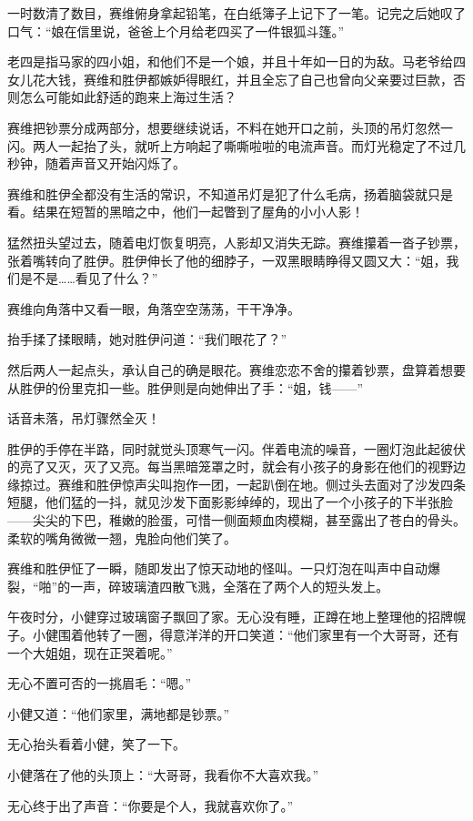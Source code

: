 一时数清了数目，赛维俯身拿起铅笔，在白纸簿子上记下了一笔。记完之后她叹了口气：``娘在信里说，爸爸上个月给老四买了一件银狐斗篷。''

老四是指马家的四小姐，和他们不是一个娘，并且十年如一日的为敌。马老爷给四女儿花大钱，赛维和胜伊都嫉妒得眼红，并且全忘了自己也曾向父亲要过巨款，否则怎么可能如此舒适的跑来上海过生活？

赛维把钞票分成两部分，想要继续说话，不料在她开口之前，头顶的吊灯忽然一闪。两人一起抬了头，就听上方响起了嘶嘶啦啦的电流声音。而灯光稳定了不过几秒钟，随着声音又开始闪烁了。

赛维和胜伊全都没有生活的常识，不知道吊灯是犯了什么毛病，扬着脑袋就只是看。结果在短暂的黑暗之中，他们一起瞥到了屋角的小小人影！

猛然扭头望过去，随着电灯恢复明亮，人影却又消失无踪。赛维攥着一沓子钞票，张着嘴转向了胜伊。胜伊伸长了他的细脖子，一双黑眼睛睁得又圆又大：``姐，我们是不是\ldots{}\ldots{}看见了什么？''

赛维向角落中又看一眼，角落空空荡荡，干干净净。

抬手揉了揉眼睛，她对胜伊问道：``我们眼花了？''

然后两人一起点头，承认自己的确是眼花。赛维恋恋不舍的攥着钞票，盘算着想要从胜伊的份里克扣一些。胜伊则是向她伸出了手：``姐，钱——''

话音未落，吊灯骤然全灭！

胜伊的手停在半路，同时就觉头顶寒气一闪。伴着电流的噪音，一圈灯泡此起彼伏的亮了又灭，灭了又亮。每当黑暗笼罩之时，就会有小孩子的身影在他们的视野边缘掠过。赛维和胜伊惊声尖叫抱作一团，一起趴倒在地。侧过头去面对了沙发四条短腿，他们猛的一抖，就见沙发下面影影绰绰的，现出了一个小孩子的下半张脸——尖尖的下巴，稚嫩的脸蛋，可惜一侧面颊血肉模糊，甚至露出了苍白的骨头。柔软的嘴角微微一翘，鬼脸向他们笑了。

赛维和胜伊怔了一瞬，随即发出了惊天动地的怪叫。一只灯泡在叫声中自动爆裂，``啪''的一声，碎玻璃渣四散飞溅，全落在了两个人的短头发上。

午夜时分，小健穿过玻璃窗子飘回了家。无心没有睡，正蹲在地上整理他的招牌幌子。小健围着他转了一圈，得意洋洋的开口笑道：``他们家里有一个大哥哥，还有一个大姐姐，现在正哭着呢。''

无心不置可否的一挑眉毛：``嗯。''

小健又道：``他们家里，满地都是钞票。''

无心抬头看着小健，笑了一下。

小健落在了他的头顶上：``大哥哥，我看你不大喜欢我。''

无心终于出了声音：``你要是个人，我就喜欢你了。''

